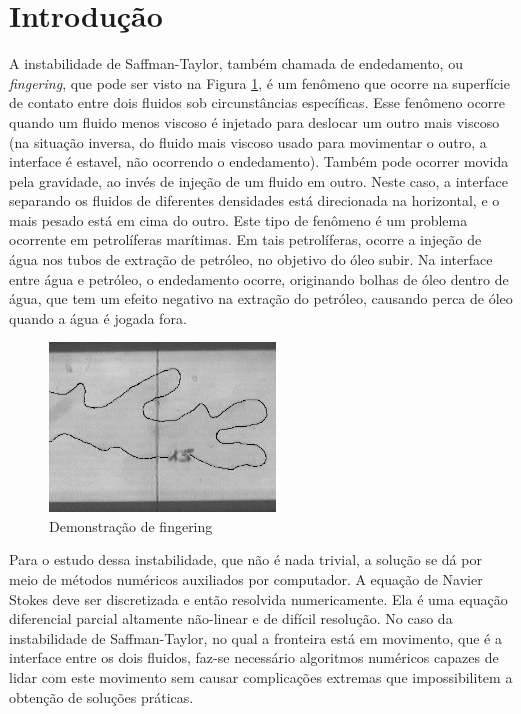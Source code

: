 \documentclass[journal]{IEEEtran}
\begin{document}
\section{Introdução}
A instabilidade de Saffman-Taylor, também chamada de endedamento, ou \textit{fingering}, que pode ser visto na Figura \ref{finger}, é um fenômeno que ocorre na superfície de contato entre dois fluidos sob circunstâncias específicas. Esse fenômeno ocorre quando um fluido menos viscoso é injetado para deslocar um outro mais viscoso (na situação inversa, do fluido mais viscoso usado para movimentar o outro, a interface é estavel, não ocorrendo o endedamento). Também pode ocorrer movida pela gravidade, ao invés de injeção de um fluido em outro. Neste caso, a interface separando os fluidos de diferentes densidades está direcionada na horizontal, e o mais pesado está em cima do outro. Este tipo de fenômeno é um problema ocorrente em petrolíferas marítimas. Em tais petrolíferas, ocorre a injeção de água nos tubos de extração de petróleo, no objetivo do óleo subir. Na interface entre água e petróleo, o endedamento ocorre, originando bolhas de óleo dentro de água, que tem um efeito negativo na extração do petróleo, causando perca de óleo quando a água é jogada fora.

\begin{figure}[!ht]
\centering
\includegraphics[width=6cm]{figures/fingergel.png}
\caption{Demonstração de fingering\label{finger}}
\end{figure}

Para o estudo dessa instabilidade, que não é nada trivial, a solução se dá por meio de métodos numéricos auxiliados por computador. A equação de Navier Stokes deve ser discretizada e então resolvida numericamente. Ela é uma equação diferencial parcial altamente não-linear e de difícil resolução. No caso da instabilidade de Saffman-Taylor, no qual a fronteira está em movimento, que é a interface entre os dois fluidos, faz-se necessário algoritmos numéricos capazes de lidar com este movimento sem causar complicações extremas que impossibilitem a obtenção de soluções práticas. 
\end{document}
